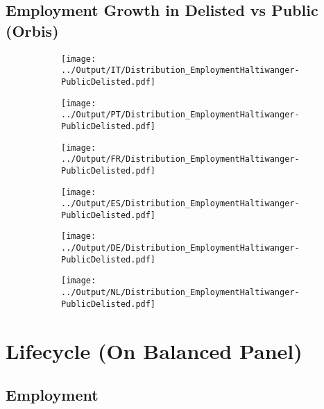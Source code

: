 \documentclass[12pt,notitlepage]{article}
\begin{document}
\subsection{Employment Growth in Delisted vs Public (Orbis)}
\begin{figure}[!htpb]
\centering
\begin{subfigure}{.49\textwidth}
    \centering
 \texttt{[image: ../Output/IT/Distribution\_EmploymentHaltiwanger-PublicDelisted.pdf]}
\end{subfigure}%
\begin{subfigure}{.49\textwidth}
    \centering
 \texttt{[image: ../Output/PT/Distribution\_EmploymentHaltiwanger-PublicDelisted.pdf]}
\end{subfigure}
\begin{subfigure}{.49\textwidth}
    \centering
 \texttt{[image: ../Output/FR/Distribution\_EmploymentHaltiwanger-PublicDelisted.pdf]}
\end{subfigure}%
\begin{subfigure}{.49\textwidth}
    \centering
 \texttt{[image: ../Output/ES/Distribution\_EmploymentHaltiwanger-PublicDelisted.pdf]}
\end{subfigure}
\begin{subfigure}{.49\textwidth}
    \centering
 \texttt{[image: ../Output/DE/Distribution\_EmploymentHaltiwanger-PublicDelisted.pdf]}
\end{subfigure}
\begin{subfigure}{.49\textwidth}
    \centering
 \texttt{[image: ../Output/NL/Distribution\_EmploymentHaltiwanger-PublicDelisted.pdf]}
\end{subfigure}
\end{figure}
\pagebreak



\FloatBarrier
\section{Lifecycle (On Balanced Panel)} %
\label{sec:lifecycle}
\FloatBarrier

\subsection{Employment} %
\label{sec:employment}
\end{document}
